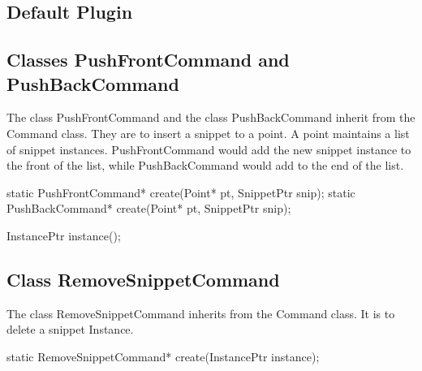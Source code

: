 
\subsection{Default Plugin}
\label{sec:default-plugin}

\subsection{Classes PushFrontCommand and PushBackCommand}
\label{sec:push-commands}


The class PushFrontCommand and the class PushBackCommand inherit from the
Command class. They are to insert a snippet to a point. A point maintains a
list of snippet instances. PushFrontCommand would add the new snippet instance
to the front of the list, while PushBackCommand would add to the end of the
list.


\begin{apient}
static PushFrontCommand* create(Point* pt, SnippetPtr snip);
static PushBackCommand* create(Point* pt, SnippetPtr snip);
\end{apient}


\begin{apient}
InstancePtr instance();
\end{apient}


\subsection{Class RemoveSnippetCommand}
\label{sec:removesnippetcommand}


The class RemoveSnippetCommand inherits from the Command class. It is to delete
a snippet Instance.


\begin{apient}
static RemoveSnippetCommand* create(InstancePtr instance);
\end{apient}


